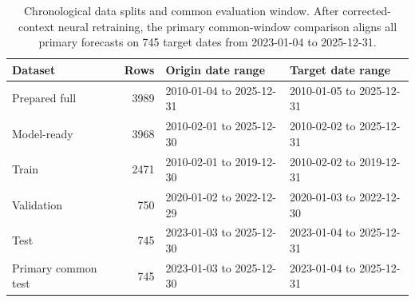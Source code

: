 \begin{table}[!t]
\centering
\caption{Chronological data splits and common evaluation window. After corrected-context neural retraining, the primary common-window comparison aligns all primary forecasts on 745 target dates from 2023-01-04 to 2025-12-31.}
\label{tab:data-splits}
\scriptsize
\setlength{\tabcolsep}{3pt}
\begin{tabular}{@{}l r L{0.31\columnwidth} L{0.31\columnwidth}@{}}
\toprule
Dataset & Rows & Origin date range & Target date range \\
\midrule
Prepared full & 3989 & 2010-01-04 to 2025-12-31 & 2010-01-05 to 2025-12-31 \\
Model-ready & 3968 & 2010-02-01 to 2025-12-30 & 2010-02-02 to 2025-12-31 \\
Train & 2471 & 2010-02-01 to 2019-12-30 & 2010-02-02 to 2019-12-31 \\
Validation & 750 & 2020-01-02 to 2022-12-29 & 2020-01-03 to 2022-12-30 \\
Test & 745 & 2023-01-03 to 2025-12-30 & 2023-01-04 to 2025-12-31 \\
Primary common test & 745 & 2023-01-03 to 2025-12-30 & 2023-01-04 to 2025-12-31 \\
\bottomrule
\end{tabular}
\end{table}
